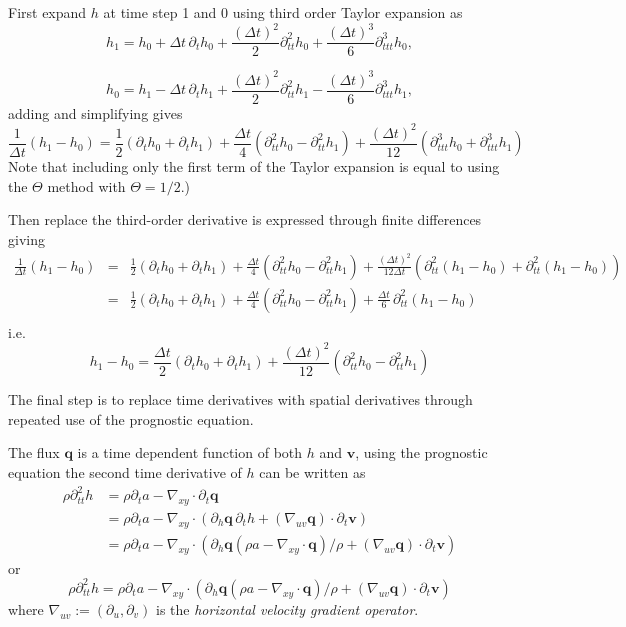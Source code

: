 \documentclass[10pt,a4paper]{book}
\newcommand{\p}{\partial}
\begin{document}
First expand $h$ at time step 1 and 0 using third order Taylor expansion as
\[
h_1=h_0+ \Delta t \, \p_t h_0 + \frac{(\Delta t)^2}{2} \p^2_{tt} h_0 + \frac{(\Delta t)^3}{6} \p^3_{ttt} h_0 ,
\] 

\[
h_0=h_1- \Delta t \, \p_t h_1 + \frac{(\Delta t)^2}{2} \p^2_{tt} h_1  - \frac{(\Delta t)^3}{6} \p^3_{ttt} h_1,
\] 
adding and simplifying gives
\begin{equation}
\frac{1}{\Delta t}(h_1-h_0)= \frac{1}{2} (\p_t h_0+ \p_t h_1) + \frac{\Delta t}{4} (\p^2_{tt} h_0 - \p^2_{tt} h_1)
+\frac{(\Delta t)^2}{12} ( \p^3_{ttt} h_0 + \p^3_{ttt} h_1) 
\label{eq:fDt}
\end{equation}
Note that including  only the first term of the Taylor expansion is equal to using the $\Theta$ method with $\Theta=1/2$.)


Then replace the third-order derivative is expressed through finite differences giving
\begin{eqnarray*}
\frac{1}{\Delta t}(h_1-h_0)&=& 
\frac{1}{2} (\p_t h_0+ \p_t h_1) + \frac{\Delta t}{4} (\p^2_{tt} h_0 - \p^2_{tt} h_1) +\frac{(\Delta t)^2}{12 \Delta t} ( \p^2_{tt} (h_1-h_0) + \p^2_{tt} (h_1-h_0)) \\
&=& \frac{1}{2} (\p_t h_0+ \p_t h_1) + \frac{\Delta t}{4} (\p^2_{tt} h_0 - \p^2_{tt} h_1) +\frac{\Delta t}{6} \,\p^2_{tt} (h_1-h_0)  \\
\end{eqnarray*}
i.e.
\begin{equation}
h_1-h_0 =  \frac{\Delta t}{2} (\p_t h_0+ \p_t h_1) + \frac{(\Delta t)^2}{12} (\p^2_{tt} h_0 -\p^2_{tt} h_1)
\label{eq:three}
\end{equation}
 

The final step is to replace time derivatives with spatial derivatives
through repeated use of the prognostic equation.


The flux $\bm{q}$ is a time dependent function of both
$h$ and $\bm{v}$, using the prognostic equation the second time
derivative of $h$ can be written as
\begin{align*}
\rho \p^2_{tt} h &= \rho \p_t a-  \nabla_{xy} \cdot \p_t \bm{q} \\
            &= \rho \p_t a-  \nabla_{xy} \cdot ( \p_h \bm{q}  \, \p_t h + (\nabla_{uv} \bm{q})\cdot  \p_t \bm{v}) \\
            &= \rho \p_t a-  \nabla_{xy} \cdot ( \p_h \bm{q}  (\rho a-\nabla_{xy} \cdot \bm{q})/\rho+ (\nabla_{uv} \bm{q})\cdot  \p_t \bm{v}) 
\end{align*}
or
\begin{equation}
\rho \p^2_{tt} h = \rho \p_t a-  \nabla_{xy} \cdot ( \p_h \bm{q}  (\rho a-\nabla_{xy} \cdot \bm{q})/\rho+ (\nabla_{uv} \bm{q})\cdot  \p_t \bm{v})
\label{eq:drm}
\end{equation}
where $\nabla_{uv}:=(\p_u , \p_v)$ is the {\em horizontal velocity gradient operator}.
\end{document}
